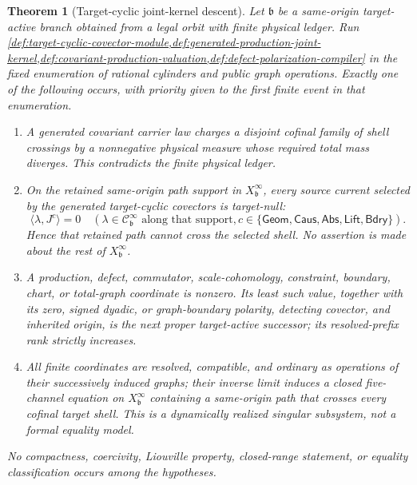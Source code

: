 \documentclass[11pt]{article}
\numberwithin{section}{part}
\theoremstyle{plain}
\newtheorem{theorem}{Theorem}[section]
\theoremstyle{definition}
\theoremstyle{remark}
\newcommand{\Geom}{\mathsf{Geom}}
\newcommand{\Caus}{\mathsf{Caus}}
\newcommand{\Abs}{\mathsf{Abs}}
\newcommand{\Lift}{\mathsf{Lift}}
\newcommand{\Bdry}{\mathsf{Bdry}}
\begin{document}
\begin{theorem}[Target-cyclic joint-kernel descent]
\label{thm:target-cyclic-joint-kernel-descent}
Let \(\mathfrak b\) be a same-origin target-active branch obtained from a
legal orbit with finite physical ledger.  Run
\cref{def:target-cyclic-covector-module,def:generated-production-joint-kernel,def:covariant-production-valuation,def:defect-polarization-compiler}
in the fixed enumeration of rational cylinders and public graph operations.
Exactly one of the following occurs, with priority given to the first finite
event in that enumeration.
\begin{enumerate}[label=\textup{(K\arabic*)}]
\item A generated covariant carrier law charges a disjoint cofinal family of
shell crossings by a nonnegative physical measure whose required total mass
diverges.  This contradicts the finite physical ledger.
\item On the retained same-origin path support in
\(X^\infty_{\mathfrak b}\), every source current selected by the generated
target-cyclic covectors is target-null:
\[
 \langle\lambda,J^c\rangle=0
 \quad
 (\lambda\in\mathscr C^\infty_{\mathfrak b}\text{ along that support},
 c\in\{\Geom,\Caus,\Abs,\Lift,\Bdry\}).
\]
Hence that retained path cannot cross the selected shell.  No assertion is
made about the rest of \(X^\infty_{\mathfrak b}\).
\item A production, defect, commutator, scale-cohomology, constraint,
boundary, chart, or total-graph coordinate is nonzero.  Its least such value,
together with its zero, signed dyadic, or graph-boundary polarity, detecting
covector, and inherited origin, is the next proper target-active successor;
its resolved-prefix rank strictly increases.
\item All finite coordinates are resolved, compatible, and ordinary as
operations of their successively induced graphs; their inverse limit induces
a closed five-channel equation on
\(X^\infty_{\mathfrak b}\) containing a same-origin path that crosses every
cofinal target shell.  This is a dynamically realized singular subsystem,
not a formal equality model.
\end{enumerate}
No compactness, coercivity, Liouville property, closed-range statement, or
equality classification occurs among the hypotheses.
\end{theorem}
\end{document}
